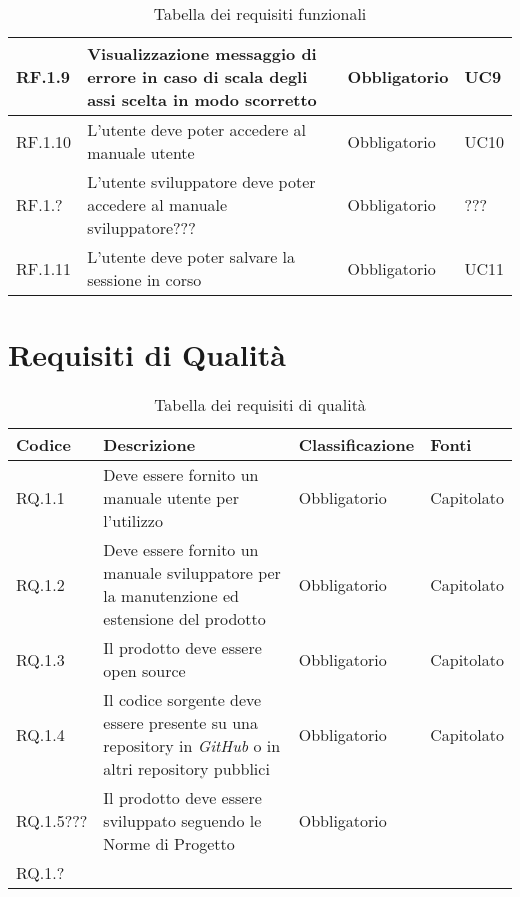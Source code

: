 \begin{table}[H]
\begin{tabular}{|p{}|p{6cm}|p{3cm}|p{2cm}|}
    \rowcolor[HTML]{EFEFEF}
    RF.1.9 & Visualizzazione messaggio di errore in caso di scala degli assi scelta in modo scorretto & Obbligatorio & UC9 \\ \hline
    \rowcolor[HTML]{C0C0C0}
    RF.1.10 & L'utente deve poter accedere al manuale utente & Obbligatorio & UC10 \\ \hline
    \rowcolor[HTML]{EFEFEF}
    RF.1.? & L'utente sviluppatore deve poter accedere al manuale sviluppatore??? & Obbligatorio & ??? \\ \hline
    \rowcolor[HTML]{C0C0C0}
    RF.1.11 & L'utente deve poter salvare la sessione in corso & Obbligatorio & UC11 \\ \hline
  \end{tabular}
  \caption{Tabella dei requisiti funzionali}
\end{table}

\section{Requisiti di Qualità}
\begin{table}[H]
  \centering
  \begin{tabular}{|p{}|p{6cm}|p{3cm}|p{2cm}|}
    \hline
    \rowcolor[HTML]{036400}
    {\color[HTML]{FFFFFF} \textbf{Codice}} & {\color[HTML]{FFFFFF} \textbf{Descrizione}} & {\color[HTML]{FFFFFF} \textbf{Classificazione}} & {\color[HTML]{FFFFFF} \textbf{Fonti}} \\ \hline
    \rowcolor[HTML]{EFEFEF}
    RQ.1.1 & Deve essere fornito un manuale utente per l'utilizzo & Obbligatorio & Capitolato \\ \hline
    \rowcolor[HTML]{C0C0C0}
    RQ.1.2 & Deve essere fornito un manuale sviluppatore per la manutenzione ed estensione del prodotto & Obbligatorio & Capitolato \\ \hline
    \rowcolor[HTML]{EFEFEF}
    RQ.1.3 & Il prodotto deve essere open source & Obbligatorio & Capitolato \\ \hline
    \rowcolor[HTML]{C0C0C0}
    RQ.1.4 & Il codice sorgente deve essere presente su una repository in \textit{GitHub} o in altri repository pubblici & Obbligatorio & Capitolato \\ \hline
    \rowcolor[HTML]{EFEFEF}
    RQ.1.5??? & Il prodotto deve essere sviluppato seguendo le Norme di Progetto & Obbligatorio &  \\ \hline
    \rowcolor[HTML]{C0C0C0}
    RQ.1.? &  &  &  \\ \hline
  \end{tabular}
  \caption{Tabella dei requisiti di qualità}
\end{table}


